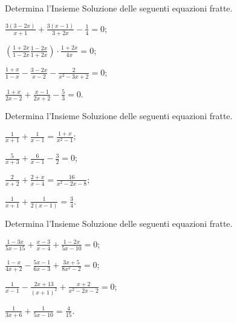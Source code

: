 \begin{esercizio}[\Ast]
 \label{ese:3.47} %
Determina l'Insieme Soluzione delle seguenti equazioni fratte.
\begin{multicols}{2}
\begin{enumeratea}
\item $\frac{3(3-2x)}{x+1} + \frac{3(x-1)}{3+2x}-\frac{1}{4}= 0$;
\item $\left(\frac{1+2x}{1-2x}\frac{1-2x}{1+2x}\right)\cdot\frac{1+2x}{4x} = 0$;
\item $\frac{1+x}{1-x} - \frac{3-2x}{x-2}-\frac{2}{x^{2}-3x+2}= 0$;
\item $\frac{1+x}{2x-2} + \frac{x-1}{2x+2}-\frac{5}{3}= 0$.
\end{enumeratea}
\end{multicols}
\end{esercizio}
\pagebreak
\begin{esercizio}[\Ast]
 \label{ese:3.48} %
Determina l'Insieme Soluzione delle seguenti equazioni fratte.
\begin{multicols}{2}
\begin{enumeratea}
\item $\frac{1}{x+1} + \frac{1}{x-1}=\frac{1+x}{x^{2}-1}$;
\item $\frac{5}{x+3}+\frac{6}{x-1}-\frac{3}{2}=0$;
\item $\frac{2}{x+2}+\frac{2+x}{x-4} = \frac{16}{x^{2}-2x-8}$;
\item $\frac{1}{x+1}+\frac{1}{2(x-1)} = \frac{3}{4}$.
\end{enumeratea}
\end{multicols}
\end{esercizio}

\begin{esercizio}[\Ast]
 \label{ese:3.49} %
Determina l'Insieme Soluzione delle seguenti equazioni fratte.
\begin{multicols}{2}
\begin{enumeratea}
\item $\frac{1-3x}{5x-15} + \frac{x-3}{x-4}+\frac{1-2x}{5x-10}= 0$;
\item $\frac{1-x}{4x+2}-\frac{5x-1}{6x-3}+\frac{3x+5}{8x^{2}-2}=0$;
\item $\frac{1}{x-1}-\frac{2x+13}{(x+1)^{2}}+\frac{x+2}{x^{2}-2x-2} = 0$;
\item $\frac{1}{3x+6}+\frac{1}{5x-10} = \frac{4}{15}$.
\end{enumeratea}
\end{multicols}
\end{esercizio}


